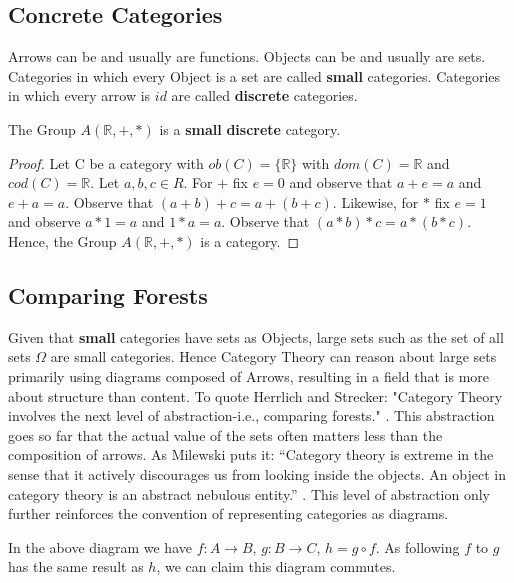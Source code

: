 \documentclass{article}
\begin{document}
\subsection{Concrete Categories}
Arrows can be and usually are functions. Objects can be and usually are sets. Categories in which every Object is a set are called \textbf{small} categories. Categories in which every arrow is $id$ are called \textbf{discrete} categories.

\begin{theorem}
The Group $A(\mathbb{R}, +, *)$ is a \textbf{small} \textbf{discrete} category.
\end{theorem}
\begin{proof}
Let C be a category with $ob(C)=\{\mathbb{R}\}$ with $dom(C) = \mathbb{R}$ and $cod(C) = \mathbb{R}$. Let $a,b,c \in R$. For $+$ fix $e = 0$ and observe that $a + e = a$ and $e + a = a$. Observe that $(a+b) + c = a + (b+c)$. Likewise, for $*$ fix $e = 1$ and observe $a * 1 = a$ and $1 * a =a$. Observe that $(a*b)*c = a*(b*c)$. Hence, the Group $A(\mathbb{R},+,*)$ is a category.
\end{proof}

\subsection{Comparing Forests}
Given that \textbf{small} categories have sets as Objects, large sets such as the set of all sets $\Omega$ are small categories. Hence Category Theory can reason about large sets primarily using diagrams composed of Arrows, resulting in a field that is more about structure than content. To quote Herrlich and Strecker: "Category Theory involves the next level of abstraction-i.e., comparing forests." \cite{Herrlich01}. This abstraction goes so far that the actual value of the sets often matters less than the composition of arrows. As Milewski puts it: “Category theory is extreme in the sense that it actively discourages us from looking inside the objects. An object in category theory is an abstract nebulous entity.” \cite{Milewski01}. This level of abstraction only further reinforces the convention of representing categories as diagrams.

\begin{center}
\end{center}
In the above diagram we have $f: A \to B$, $g: B\to C$, $h = g \circ f$. As following $f$ to $g$ has the same result as $h$, we can claim this diagram commutes.
\end{document}
